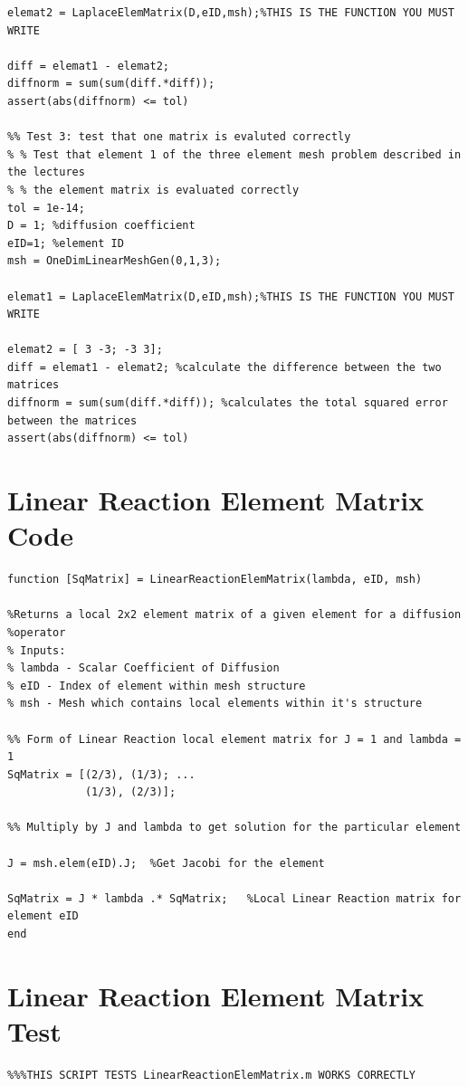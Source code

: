 \documentclass[11pt]{article}
\begin{document}
\begin{appendices}
\begin{lstlisting}
elemat2 = LaplaceElemMatrix(D,eID,msh);%THIS IS THE FUNCTION YOU MUST WRITE

diff = elemat1 - elemat2;
diffnorm = sum(sum(diff.*diff));
assert(abs(diffnorm) <= tol)

%% Test 3: test that one matrix is evaluted correctly
% % Test that element 1 of the three element mesh problem described in the lectures
% % the element matrix is evaluated correctly
tol = 1e-14;
D = 1; %diffusion coefficient
eID=1; %element ID
msh = OneDimLinearMeshGen(0,1,3);

elemat1 = LaplaceElemMatrix(D,eID,msh);%THIS IS THE FUNCTION YOU MUST WRITE

elemat2 = [ 3 -3; -3 3];
diff = elemat1 - elemat2; %calculate the difference between the two matrices
diffnorm = sum(sum(diff.*diff)); %calculates the total squared error between the matrices
assert(abs(diffnorm) <= tol)
\end{lstlisting}
\pagebreak


\section{Linear Reaction Element Matrix Code} \label{ap:React}
\begin{lstlisting}
function [SqMatrix] = LinearReactionElemMatrix(lambda, eID, msh)

%Returns a local 2x2 element matrix of a given element for a diffusion
%operator
% Inputs: 
% lambda - Scalar Coefficient of Diffusion
% eID - Index of element within mesh structure
% msh - Mesh which contains local elements within it's structure

%% Form of Linear Reaction local element matrix for J = 1 and lambda = 1
SqMatrix = [(2/3), (1/3); ...
            (1/3), (2/3)];

%% Multiply by J and lambda to get solution for the particular element

J = msh.elem(eID).J;  %Get Jacobi for the element

SqMatrix = J * lambda .* SqMatrix;   %Local Linear Reaction matrix for element eID
end
\end{lstlisting}
\pagebreak
\section{Linear Reaction Element Matrix Test} \label{ap:ReactTest}
\begin{lstlisting}
%%%THIS SCRIPT TESTS LinearReactionElemMatrix.m WORKS CORRECTLY


\end{lstlisting}
\end{appendices}
\end{document}
